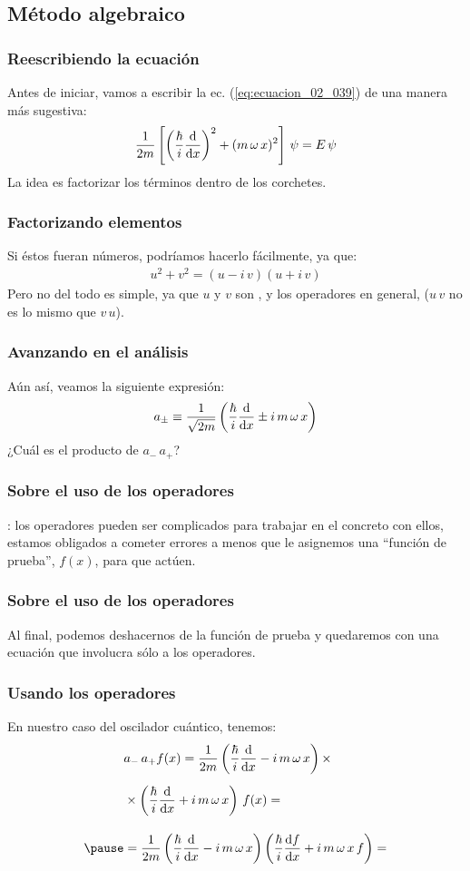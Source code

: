 \documentclass[12pt]{beamer}
\begin{document}
\subsection{Método algebraico}

\begin{frame}
\frametitle{Reescribiendo la ecuación}
Antes de iniciar, vamos a escribir la ec. (\ref{eq:ecuacion_02_039}) de una manera más sugestiva:
\pause
\begin{equation}
\dfrac{1}{2 m} \left[ \left( \dfrac{\hbar}{i} \dv{x} \right)^{2} + (m \, \omega \, x)^{2} \right] \, \psi = E \, \psi
\label{eq:ecuacion_02_040}
\end{equation}
\pause
La idea es factorizar los términos dentro de los corchetes.
\end{frame}
\begin{frame}
\frametitle{Factorizando elementos}
Si éstos fueran números, podríamos hacerlo fácilmente, ya que:
\pause
\begin{align*}
u^{2} + v^{2} = (u - i \, v)(u + i \, v)
\end{align*}
Pero no del todo es simple, ya que $u$ y $v$ son , \pause y los operadores en general,  ($u \, v$ no es lo mismo que $v \, u$).
\end{frame}
\begin{frame}
\frametitle{Avanzando en el análisis}
Aún así, veamos la siguiente expresión:
\pause
\begin{equation}
a_{\pm} \equiv \dfrac{1}{\sqrt{2 m }} \left( \dfrac{\hbar}{i} \dv{x} \pm i \, m \, \omega \, x \right)
\label{eq:ecuacion_02_041}
\end{equation}
\pause
¿Cuál es el producto de $a_{-} \, a_{+}$? 
\end{frame}
\begin{frame}
\frametitle{Sobre el uso de los operadores}
: \pause los operadores pueden ser complicados para trabajar en el concreto con ellos, \pause estamos obligados a cometer errores a menos que le asignemos una \enquote{función de prueba}, $f (x)$, para que actúen.
\end{frame}
\begin{frame}
\frametitle{Sobre el uso de los operadores}
Al final, podemos deshacernos de la función de prueba y quedaremos con una ecuación que involucra sólo a los operadores.
\end{frame}
\begin{frame}
\frametitle{Usando los operadores}
En nuestro caso del oscilador cuántico, tenemos:
\pause
\begin{eqnarray*}
\begin{aligned}
&a_{-} \, a_{+} f(x) = \dfrac{1}{2 m} \left( \dfrac{\hbar}{i} \dv{x} - i \, m \, \omega \, x \right) \times \\[0.5em]
&\times \left( \dfrac{\hbar}{i} \dv{x} + i \, m \, \omega \, x \right) \, f(x) = \\[1em] \pause
&= \dfrac{1}{2 m} \left( \dfrac{\hbar}{i} \dv{x} - i \, m \, \omega \, x \right) \left( \dfrac{\hbar}{i} \dv{f}{x} + i \, m \, \omega \, x \, f \right) =
\end{aligned}
\end{eqnarray*}
\end{frame}
\end{document}
